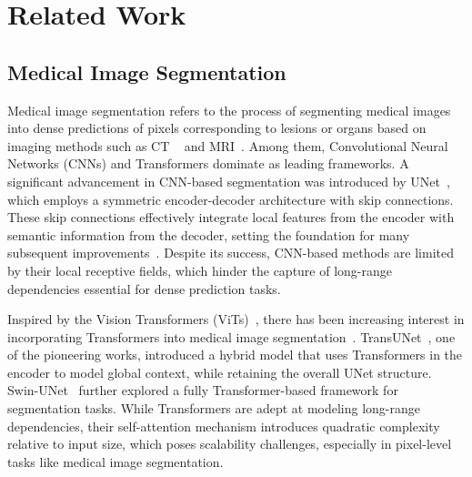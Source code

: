\section{Related Work}
\subsection{Medical Image Segmentation}
Medical image segmentation refers to the process of segmenting medical images into dense predictions of pixels corresponding to lesions or organs based on imaging methods such as CT ~\cite{zhou2019semi,zhou2019prior,wang2019abdominal,fu2021review} and MRI~\cite{ji2022amos,zeng2020review}. Among them, Convolutional Neural Networks (CNNs) and Transformers dominate as leading frameworks. A significant advancement in CNN-based segmentation was introduced by UNet~\cite{ronneberger2015u}, which employs a symmetric encoder-decoder architecture with skip connections. These skip connections effectively integrate local features from the encoder with semantic information from the decoder, setting the foundation for many subsequent improvements~\cite{zhou2019unet++,oktay2018attention,le2023rrc,huang2021missformer,tang2021recurrent}. Despite its success, CNN-based methods are limited by their local receptive fields, which hinder the capture of long-range dependencies essential for dense prediction tasks.

Inspired by the Vision Transformers (ViTs)~\cite{dosovitskiy2020image}, there has been increasing interest in incorporating Transformers into medical image segmentation~\cite{hatamizadeh2022unetr,zhou2023nnformer,lin2022ds,huang2022missformer,wang2022mixed,zhao2024semi}. TransUNet~\cite{chen2024transunet}, one of the pioneering works, introduced a hybrid model that uses Transformers in the encoder to model global context, while retaining the overall UNet structure. Swin-UNet~\cite{cao2022swin} further explored a fully Transformer-based framework for segmentation tasks. While Transformers are adept at modeling long-range dependencies, their self-attention mechanism introduces quadratic complexity relative to input size, which poses scalability challenges, especially in pixel-level tasks like medical image segmentation.

